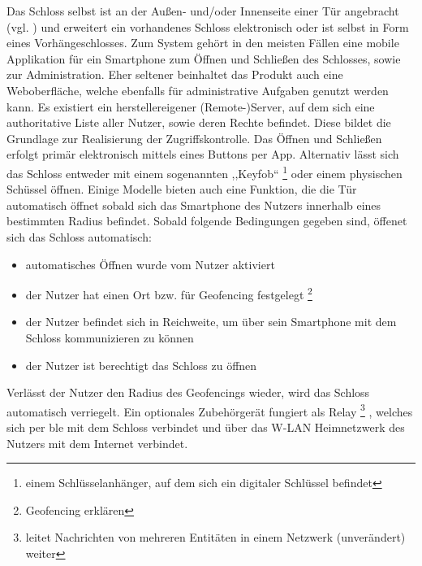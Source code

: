 	    \noindent Das Schloss selbst ist an der Außen- und/oder Innenseite einer Tür angebracht (vgl. ) und erweitert ein vorhandenes Schloss elektronisch oder ist selbst in Form eines Vorhängeschlosses\cite{Ho2016}. 
		Zum System gehört in den meisten Fällen eine mobile Applikation für ein Smartphone zum Öffnen und Schließen des Schlosses, sowie zur Administration\cite{Fuller2017}. 
        Eher seltener beinhaltet das Produkt auch eine Weboberfläche, welche ebenfalls für administrative Aufgaben genutzt werden kann\cite{Ho2016}. 
		Es existiert ein herstellereigener (Remote-)Server, auf dem sich eine authoritative Liste aller Nutzer, sowie deren Rechte befindet. 
        Diese bildet die Grundlage zur Realisierung der Zugriffskontrolle.\cite{Fuller2017} 
        Das Öffnen und Schließen erfolgt primär elektronisch mittels eines Buttons per App.
        Alternativ lässt sich das Schloss entweder mit einem sogenannten ,,Keyfob`` 
        \footnote{einem Schlüsselanhänger, auf dem sich ein digitaler Schlüssel befindet} 
        oder einem physischen Schüssel öffnen\cite{Ho2016}. 
        Einige Modelle bieten auch eine Funktion, die die Tür automatisch öffnet sobald sich das Smartphone des Nutzers innerhalb eines bestimmten Radius befindet. 
        Sobald folgende Bedingungen gegeben sind, öffenet sich das Schloss automatisch:
        \begin{itemize}[noitemsep]
        	\item automatisches Öffnen wurde vom Nutzer aktiviert
        	\item der Nutzer hat einen Ort bzw. für Geofencing festgelegt \footnote{Geofencing erklären}
        	\item der Nutzer befindet sich in Reichweite, um über sein Smartphone mit dem Schloss kommunizieren zu können
        	\item der Nutzer ist berechtigt das Schloss zu öffnen
        \end{itemize}
    	Verlässt der Nutzer den Radius des Geofencings wieder, wird das Schloss automatisch verriegelt.
		Ein optionales Zubehörgerät fungiert als Relay
		\footnote{leitet Nachrichten von mehreren Entitäten in einem Netzwerk (unverändert) weiter}
		, welches sich per \gls{ble} mit dem Schloss verbindet und über das W-LAN Heimnetzwerk des Nutzers mit dem Internet verbindet.
		
